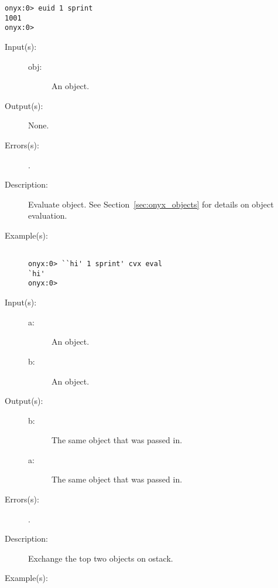 \begin{description}
\begin{description}
\begin{verbatim}
onyx:0> euid 1 sprint
1001
onyx:0>
		\end{verbatim}
	\end{description}
\label{systemdict:eval}
\item[{\onyxop{obj}{eval}{--}}: ]
	\begin{description}\item[]
	\item[Input(s): ]
		\begin{description}\item[]
		\item[obj: ]
			An object.
		\end{description}
	\item[Output(s): ] None.
	\item[Errors(s): ]
		\begin{description}\item[]
		\item[.]
		\end{description}
	\item[Description: ]
		Evaluate object.  See Section~\ref{sec:onyx_objects} for
		details on object evaluation.
	\item[Example(s): ]\begin{verbatim}

onyx:0> ``hi' 1 sprint' cvx eval
`hi'
onyx:0>
		\end{verbatim}
	\end{description}
\label{systemdict:exch}
\item[{\onyxop{a b}{exch}{b a}}: ]
	\begin{description}\item[]
	\item[Input(s): ]
		\begin{description}\item[]
		\item[a: ]
			An object.
		\item[b: ]
			An object.
		\end{description}
	\item[Output(s): ]
		\begin{description}\item[]
		\item[b: ]
			The same object that was passed in.
		\item[a: ]
			The same object that was passed in.
		\end{description}
	\item[Errors(s): ]
		\begin{description}\item[]
		\item[.]
		\end{description}
	\item[Description: ]
		Exchange the top two objects on ostack.
	\item[Example(s): ]\begin{verbatim}


\end{verbatim}
\end{description}
\end{description}

